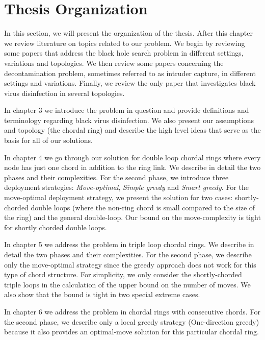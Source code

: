 
\section{Thesis Organization} 

In this section, we will present the organization of the thesis. After this chapter we review literature on topics related to our problem. We begin by reviewing some papers that address the black hole search problem in different settings, variations and topologies. We then review some papers concerning the decontamination problem, sometimes referred to as intruder capture, in different settings and variations. Finally, we review the only paper that investigates black virus disinfection in several topologies.

In chapter  3  we introduce the problem in question and provide definitions and terminology regarding black virus disinfection. We also present our assumptions and topology (the chordal ring) and describe the high level ideas that serve as the basis for all of our solutions.

In chapter 4 we go through our solution for double loop chordal rings where every node has just one chord in addition to the ring link. 
We describe in detail the two phases and  their complexities. For the second phase, we  introduce  three deployment strategies: {\em Move-optimal}, {\em Simple greedy} and {\em Smart greedy}. For the move-optimal deployment strategy, we present the solution for two cases: shortly-chorded double loops (where the non-ring chord is small compared to the size of the ring) and the general double-loop.  Our bound on the move-complexity is tight for shortly chorded double loops.

In chapter 5 we address the problem in  triple loop chordal rings. 
We describe in detail the two phases and  their complexities. For the second phase, we  describe only the move-optimal strategy since the greedy approach does not work for this type of chord structure. For simplicity, we only consider  the shortly-chorded triple loops in the calculation of the upper bound on the number of moves. We also show that the  bound is tight in  two special extreme cases.

In chapter 6 we address the problem in chordal rings with consecutive chords.   For  the second phase, we describe only a local greedy strategy (One-direction greedy) because it also provides an optimal-move solution for this particular chordal ring.

